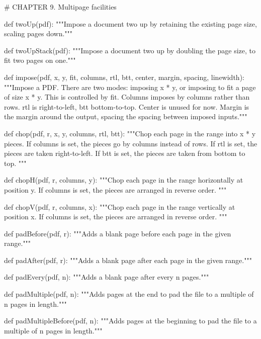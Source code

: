 # CHAPTER 9. Multipage facilities

def twoUp(pdf):
    """Impose a document two up by retaining the existing page size, scaling
    pages down."""

def twoUpStack(pdf):
    """Impose a document two up by doubling the page size, to fit two pages on
    one."""

def impose(pdf, x, y, fit, columns, rtl, btt, center, margin, spacing, linewidth):
    """Impose a PDF. There are two modes: imposing x * y, or imposing to fit a
    page of size x * y. This is controlled by fit. Columns imposes by columns
    rather than rows. rtl is right-to-left, btt bottom-to-top. Center is unused
    for now. Margin is the margin around the output, spacing the spacing
    between imposed inputs."""

def chop(pdf, r, x, y, columns, rtl, btt):
    """Chop each page in the range into x * y pieces. If columns is set, the
    pieces go by columns instead of rows. If rtl is set, the pieces are taken
    right-to-left. If btt is set, the pieces are taken from bottom to top. """

def chopH(pdf, r, columns, y):
    """Chop each page in the range horizontally at position y. If columns is
    set, the pieces are arranged in reverse order. """

def chopV(pdf, r, columns, x):
    """Chop each page in the range vertically at position x. If columns is
    set, the pieces are arranged in reverse order. """

def padBefore(pdf, r):
    """Adds a blank page before each page in the given range."""

def padAfter(pdf, r):
    """Adds a blank page after each page in the given range."""

def padEvery(pdf, n):
    """Adds a blank page after every n pages."""

def padMultiple(pdf, n):
    """Adds pages at the end to pad the file to a multiple of n pages in
    length."""

def padMultipleBefore(pdf, n):
    """Adds pages at the beginning to pad the file to a multiple of n pages in
    length."""
